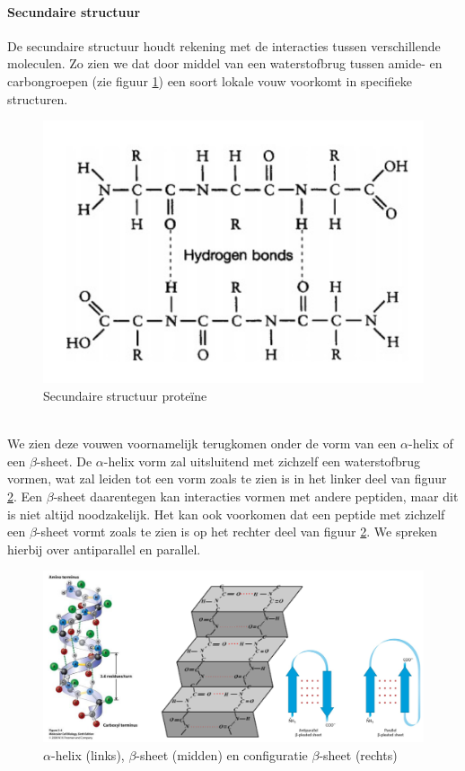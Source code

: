 \documentclass[a4paper,kul]{kulakarticle} %
\begin{document}
\paragraph{Secundaire structuur}
De secundaire structuur houdt rekening met de interacties tussen verschillende moleculen. Zo zien we dat door middel van een waterstofbrug tussen amide- en carbongroepen (zie figuur \ref{fig:secundairestructuur}) een soort lokale vouw voorkomt in specifieke structuren. 
\begin{figure}[h]
	\centering
	\includegraphics[width=0.5\linewidth]{SecundaireStructuur}
	\caption[Secundaire structuur proteïne]{Secundaire structuur proteïne}
	\label{fig:secundairestructuur}
\end{figure}\\
We zien deze vouwen voornamelijk terugkomen onder de vorm van een $\alpha$-helix of een $\beta$-sheet. De $\alpha$-helix vorm zal uitsluitend met zichzelf een waterstofbrug vormen, wat zal leiden tot een vorm zoals te zien is in het linker deel van figuur \ref{fig:secundairestructuurtype}. Een $\beta$-sheet daarentegen kan interacties vormen met andere peptiden, maar dit is niet altijd noodzakelijk. Het kan ook voorkomen dat een peptide met zichzelf een $\beta$-sheet vormt zoals te zien is op het rechter deel van figuur \ref{fig:secundairestructuurtype}. We spreken hierbij over antiparallel en parallel.
\begin{figure}[h]
	\centering
	\includegraphics[width=0.7\linewidth]{SecundaireStructuurType}
	\caption[Secundaire structuur type]{$\alpha$-helix (links), $\beta$-sheet (midden) en configuratie $\beta$-sheet (rechts)}
	\label{fig:secundairestructuurtype}
\end{figure}
\newpage
\end{document}
